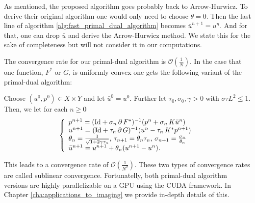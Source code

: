     As mentioned, the proposed algorithm goes probably back to Arrow-Hurwicz. To derive their original algorithm one would only need to choose $\theta = 0$. Then the last line of algorithm \ref{alg:fast_primal_dual_algorithm} becomes $\bar{u}^{n+1} = u^{n}$. And for that, one can drop $\bar{u}$ and derive the Arrow-Hurwicz method. We state this for the sake of completeness but will not consider it in our computations.

    The convergence rate for our primal-dual algorithm is $\mathcal{O}(\frac{1}{N})$. In the case that one function, $F^{\ast}$ or $G$, is uniformly convex one gets the following variant of the primal-dual algorithm:

    \begin{algorithm}
    \label{alg:f_star_or_g_uniformly_convex}
        Choose $(u^{0}, p^{0}) \in X \times Y$ and let $\bar{u}^{0} = u^{0}$. Further let $\tau_{0}, \sigma_{0}, \gamma > 0$ with $\sigma\tau L^{2} \le 1$. Then, we let for each $n \ge 0$
            \begin{equation}
                \left\{ 
                    \begin{array}{l l}
                        p^{n+1} = (\textnormal{Id} + \sigma_{n}\,\partial\,F^{\ast})^{-1}(p^{n} + \sigma_{n}\,K\bar{u}^{n}) \\
                        u^{n+1} = (\textnormal{Id} + \tau_{n}\,\partial\,G)^{-1}(u^{n} - \tau_{n}\,K^{\ast}p^{n+1}) \\
                        \theta_{n} = \frac{1}{\sqrt{1 + 2\gamma\tau_{n}}}, \, \tau_{n+1} = \theta_{n}\tau_{n}, \, \sigma_{n+1} = \frac{\sigma_{n}}{\theta_{n}} \\
                        \bar{u}^{n+1} = u^{n+1} + \theta_{n} (u^{n+1} - u^{n}).
                    \end{array}
                \right.
            \label{eq:f_star_or_g_uniformly_convex}
            \end{equation}
    \end{algorithm}

    This leads to a convergence rate of $\mathcal{O}(\frac{1}{N^{2}})$. These two types of convergence rates are called sublinear convergence. Fortunatelly, both primal-dual algorithm versions are highly parallelizable on a GPU using the CUDA framework. In Chapter \ref{cha:applications_to_imaging} we provide in-depth details of this.


